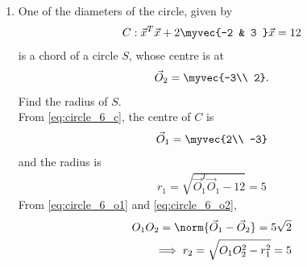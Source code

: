 \begin{enumerate}[label=\arabic*.,ref=\thesubsection.\theenumi]
%
%
\item One of the diameters of the circle, given by 
\begin{equation}
C: \vec{x}^T\vec{x} +2\myvec{-2 & 3 }\vec{x} = 12
\label{eq:circle_6_c}
\end{equation}
is a chord of a circle $S$, whose centre is at 
\begin{equation}
\vec{O}_2=\myvec{-3\\ 2}.
\label{eq:circle_6_o2}
\end{equation}
Find the radius of $S$.
\\
\solution From \eqref{eq:circle_6_c}, the centre of $C$ is 
\begin{align}
\vec{O}_1 = \myvec{2\\ -3} 
\label{eq:circle_6_o1}
\end{align}
%
and the radius is 
\begin{align}
r_1 = \sqrt{\vec{O}_1^T\vec{O}_1-12} = 5
\label{eq:circle_6_r1}
\end{align}
%
From \eqref{eq:circle_6_o1} and \eqref{eq:circle_6_o2},
\begin{align}
O_1O_2 = \norm{\vec{O}_1-\vec{O}_2}=5\sqrt{2}
\nonumber \\
\label{eq:circle_6_o1o2}
\implies r_2 = \sqrt{O_1O_2^2-r_1^2} = 5
\end{align}


\end{enumerate}
